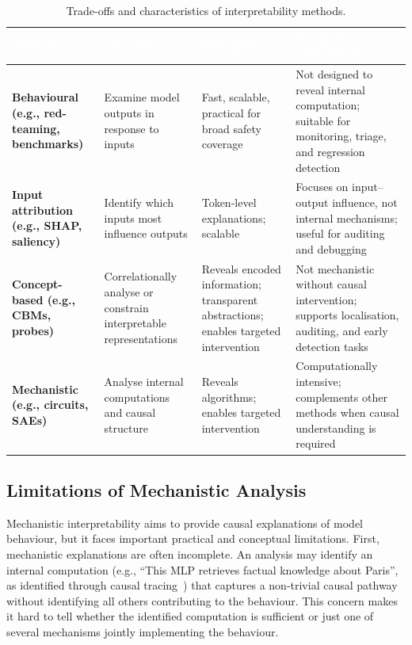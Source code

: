 \begin{table}[tb]
\centering
\caption{Trade-offs and characteristics of interpretability methods.}
\label{tab:interpretability-methods}
\renewcommand{\arraystretch}{1.3}
\begin{tabular}{>{\raggedright\arraybackslash}p{3cm} 
                >{\raggedright\arraybackslash}p{4cm} 
                >{\raggedright\arraybackslash}p{4cm} 
                >{\raggedright\arraybackslash}p{4cm}}
\toprule
\rowcolor{tableheader!80} \textcolor{white}{\textbf{Method}} & 
\textcolor{white}{\textbf{Core Idea}} & 
\textcolor{white}{\textbf{Strengths}} & 
\textcolor{white}{\textbf{Intended Use and Limitations}} \\
\midrule
\rowcolor{tablerow1} \textbf{Behavioural (e.g., red-teaming, benchmarks)} & Examine model outputs in response to inputs & Fast, scalable, practical for broad safety coverage & Not designed to reveal internal computation; suitable for monitoring, triage, and regression detection \\
\rowcolor{tablerow2} \textbf{Input attribution (e.g., SHAP, saliency)} & Identify which inputs most influence outputs & Token-level explanations; scalable & Focuses on input--output influence, not internal mechanisms; useful for auditing and debugging \\
\rowcolor{tablerow1} \textbf{Concept-based (e.g., CBMs, probes)} & Correlationally analyse or constrain interpretable representations & Reveals encoded information; transparent abstractions; enables targeted intervention & Not mechanistic without causal intervention; supports localisation, auditing, and early detection tasks \\
\rowcolor{tablerow2} \textbf{Mechanistic (e.g., circuits, SAEs)} & Analyse internal computations and causal structure & Reveals algorithms; enables targeted intervention & Computationally intensive; complements other methods when causal understanding is required \\
\bottomrule
\end{tabular}
\end{table}

\subsection{Limitations of Mechanistic Analysis}
\label{subsec:limits}

Mechanistic interpretability aims to provide causal explanations of model behaviour, but it faces important practical and conceptual limitations. First, mechanistic explanations are often incomplete. An analysis may identify an internal computation (e.g., ``This MLP retrieves factual knowledge about Paris'', as identified through causal tracing~) that captures a non-trivial causal pathway without identifying all others contributing to the behaviour. This concern makes it hard to tell whether the identified computation is sufficient or just one of several mechanisms jointly implementing the behaviour.

